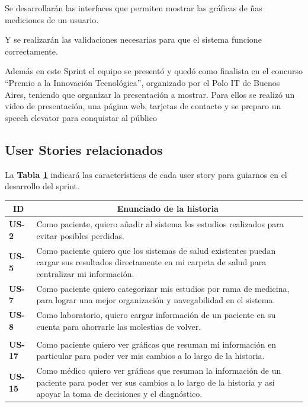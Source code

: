 \documentclass[a4paper,12pt]{article}
\begin{document}
Se desarrollarán las interfaces que permiten mostrar las gráficas de ñas mediciones de un usuario.

Y se realizarán las validaciones necesarias para que el sistema funcione correctamente.


Además en este Sprint el equipo se presentó y quedó como finalista en el  concurso ``Premio a la Innovación Tecnológica'', organizado por el Polo IT de Buenos Aires, teniendo que organizar la presentación a mostrar. Para ellos se realizó un video de presentación, una página web, tarjetas de contacto y se preparo un speech elevator para conquistar al público


\subsection{User Stories relacionados}
La \textbf{Tabla \ref{US-Sprint3} } indicará las características de cada user story para guiarnos en el desarrollo del sprint.

\begin{table}[h]
    \label{US-Sprint3}
    \centering
	\begin{tabular}{|l|p{9cm}|}
	\hline
        \multicolumn{1}{|c|}{\textbf{ID}} &
        \multicolumn{1}{|c|}{\textbf{Enunciado de la historia}} \\          
    \hline
        \textbf{US-2 } & Como paciente, quiero añadir al sistema los estudios realizados para evitar posibles perdidas.\\
     \hline 
        \textbf{US-5 } & Como paciente quiero que los sistemas de salud existentes puedan cargar sus resultados directamente en mi carpeta de salud para centralizar mi información. \\
      \hline 
        \textbf{US-7} & Como paciente quiero categorizar mis estudios por rama de medicina, para lograr una mejor organización y navegabilidad en el sistema. \\
       \hline 
        \textbf{US-8} & Como laboratorio, quiero cargar información de un paciente en su cuenta para ahorrarle las molestias de volver. \\
        \\
    \hline 
	    \textbf{US-17} &   Como paciente quiero ver gráficas que resuman mi información en particular para poder ver mis cambios a lo largo de la historia.\\
    \hline        
        \textbf{US-15} & Como médico quiero ver gráficas que resuman la información de un paciente para poder ver sus cambios a lo largo de la historia y así apoyar la toma de decisiones y el diagnóstico.\\
    \hline
    \end{tabular}

\end{table}
\end{document}

